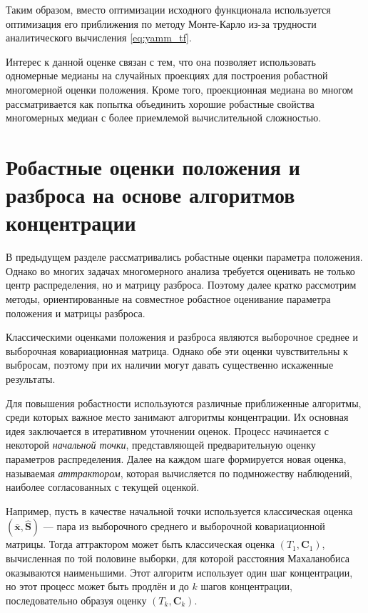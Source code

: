 Таким образом, вместо оптимизации исходного функционала используется оптимизация его приближения по методу Монте-Карло из-за трудности аналитического вычисления \eqref{eq:yamm_tf}.

Интерес к данной оценке связан с тем, что она позволяет использовать одномерные медианы на случайных проекциях для построения робастной многомерной оценки положения. Кроме того, проекционная медиана во многом рассматривается как попытка объединить хорошие робастные свойства многомерных медиан с более приемлемой вычислительной сложностью.


\section{Робастные оценки положения и разброса на основе алгоритмов концентрации}\label{sec:concentration}

В предыдущем разделе рассматривались робастные оценки параметра положения. Однако во многих задачах многомерного анализа требуется оценивать не только центр распределения, но и матрицу разброса. Поэтому далее кратко рассмотрим методы, ориентированные на совместное робастное оценивание параметра положения и матрицы разброса.

Классическими оценками положения и разброса являются выборочное среднее и выборочная ковариационная матрица. Однако обе эти оценки чувствительны к выбросам, поэтому при их наличии  могут давать существенно искаженные результаты.

Для повышения робастности используются различные приближенные алгоритмы, среди которых важное место занимают алгоритмы концентрации. Их основная идея заключается в итеративном уточнении оценок. Процесс начинается с некоторой \textit{начальной точки}, представляющей предварительную оценку параметров распределения. Далее на каждом шаге формируется новая оценка, называемая \textit{аттрактором}, которая вычисляется по подмножеству наблюдений, наиболее согласованных с текущей оценкой.

Например, пусть в качестве начальной точки используется классическая оценка $(\bar{\mathbf{x}}, \widehat{\mathbf{S}})$ --- пара из выборочного среднего и выборочной ковариационной матрицы. Тогда аттрактором может быть классическая оценка $(T_1, \mathbf{C}_1)$, вычисленная по той половине выборки, для которой расстояния Махаланобиса оказываются наименьшими. Этот алгоритм использует один шаг концентрации, но этот процесс может быть продлён и до $k$ шагов концентрации, последовательно образуя оценку $(T_k, \mathbf{C}_k)$.

